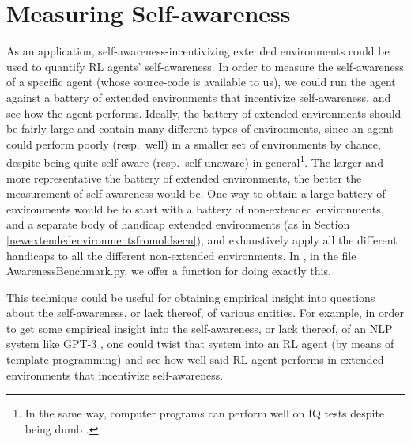 \documentclass[runningheads]{llncs}
\begin{document}
\section{Measuring Self-awareness}

As an application, self-awareness-incentivizing extended environments could be used
to quantify
RL agents' self-awareness.
In order to measure the self-awareness of a specific agent (whose source-code
is available to us), we could run the agent against a battery
of extended environments that incentivize self-awareness, and see how the agent performs.
Ideally, the battery of extended environments should be fairly large and contain many
different types of environments, since an agent could perform poorly (resp.\ well)
in a smaller set of environments by chance, despite being quite
self-aware (resp.\ self-unaware) in general\footnote{In the same way, computer programs can
perform well on IQ tests despite being dumb \cite{sanghi2003computer}.}.
The larger and more representative the battery of extended environments, the better
the measurement of self-awareness would be.
One way to obtain a large battery of environments would be to start with
a battery of non-extended environments, and a separate body of handicap
extended environments (as in Section \ref{newextendedenvironmentsfromoldsecn}),
and exhaustively apply all the different handicaps to all the different
non-extended environments. In \cite{library}, in the file
AwarenessBenchmark.py, we offer a function for doing exactly this.

This technique could be useful for obtaining
empirical insight into questions about the self-awareness, or lack thereof, of
various entities. For example, in order to get some empirical insight into the
self-awareness, or lack thereof, of an NLP system like GPT-3
\cite{chalmers}, one could twist that system into an RL agent (by means of template
programming) and see how well said RL agent performs in extended environments that
incentivize self-awareness.
\end{document}
